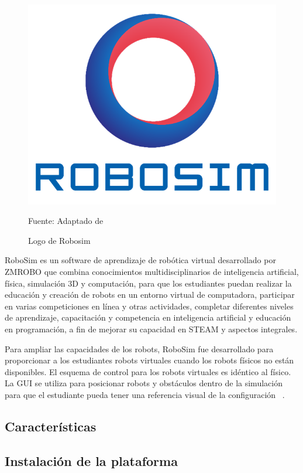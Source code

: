 \begin{figure}[H]
    \centering
    \includegraphics[scale = 0.50]{Imagenes/robosimlogo.png}
    \caption{Logo de Robosim}{Fuente: Adaptado de ~\cite{robosim}}
\end{figure}

RoboSim es un software de aprendizaje de robótica virtual desarrollado por ZMROBO que combina conocimientos multidisciplinarios de inteligencia artificial, física, simulación 3D y computación, para que los estudiantes puedan realizar la educación y creación de robots en un entorno virtual de computadora, participar en varias competiciones en línea y otras actividades, completar diferentes niveles de aprendizaje, capacitación y competencia en inteligencia artificial y educación en programación, a fin de mejorar su capacidad en STEAM y aspectos integrales.

Para ampliar las capacidades de los robots, RoboSim fue desarrollado para proporcionar a los estudiantes robots virtuales cuando los robots físicos no están disponibles. El esquema de control para los robots virtuales es idéntico al físico. La GUI se utiliza para posicionar robots y obstáculos dentro de la simulación para que el estudiante pueda tener una referencia visual de la configuración ~\cite{gucwa2}.

\subsection{Características}


\subsection{Instalación de la plataforma}


